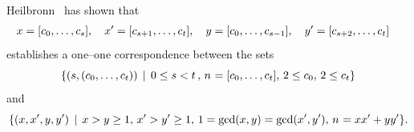   Heilbronn~\cite[page~93]{Heilbronn69} has shown that
  \begin{align*}
    \LeftA  = \ExpansionOf{\Entry[0],\ldots,\Entry[\MidIndex]},\quad  \LeftB  = \ExpansionOf{\Entry[\MidIndex+1],\ldots,\Entry[\LastIndex]}, \quad  \RightA  = \ExpansionOf{\Entry[0],\ldots,\Entry[\MidIndex-1]}, \quad  \RightB  &= \ExpansionOf{\Entry[\MidIndex+2],\ldots,\Entry[\LastIndex]}
  \end{align*}
  establishes a one--one correspondence between the sets
  \[
    \SetOf[{
      0\leq\MidIndex<\LastIndex\,,\,
      \Size=\ExpansionOf{\Entry[0],\ldots,\Entry[\LastIndex]},\,
      2 \leq \Entry[0],\,
      2\leq \Entry[\LastIndex]
    }]{
      (\MidIndex,(\Entry[0],\ldots,\Entry[\LastIndex]))
    }
  \]
  and
  \[
    \SetOf[
    \LeftA > \RightA \geq 1,\,
    \LeftB > \RightB \geq 1,\,
    1 = \gcdOf{\LeftA,\RightA} = \gcdOf{\LeftB,\RightB},\,
    \Size = \LeftA\LeftB+\RightA\RightB
    ]{(\LeftA,\LeftB,\RightA,\RightB)}
    .
  \]

